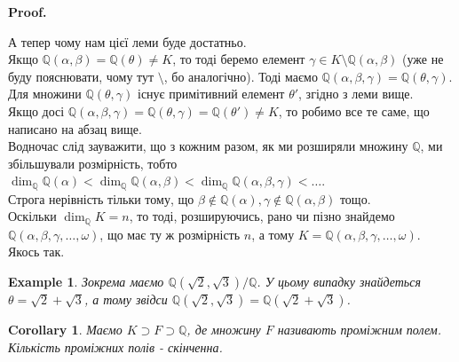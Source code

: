 \documentclass[a4paper, 10pt]{article}
\makeatletter
\theoremstyle{theoremdd}
\theoremstyle{theoremdd}
\theoremstyle{theoremdd}
\theoremstyle{theoremdd}
\newtheorem{example}[theorem]{Example}
\theoremstyle{theoremdd}
\theoremstyle{theoremdd}
\theoremstyle{theoremdd}
\theoremstyle{theoremdd}
\newtheorem{corollary}[theorem]{Corollary}
\renewenvironment{proof}[1][Proof.\\]{\par
\pushQED{\hfill \qed}%
\normalfont \topsep6\p@\@plus6\p@\relax
\trivlist
\item\relax
{\bfseries
#1\@addpunct{.}}\hspace\labelsep\ignorespaces
}{%
\popQED\endtrivlist\@endpefalse
}
\makeatother
\begin{document}
\begin{proof}
А тепер чому нам цієї леми буде достатньо.\\
Якщо $\mathbb{Q}(\alpha,\beta) = \mathbb{Q}(\theta) \neq K$, то тоді беремо елемент $\gamma \in K \setminus \mathbb{Q}(\alpha,\beta)$ (уже не буду пояснювати, чому тут $\setminus$, бо аналогічно). Тоді маємо $\mathbb{Q}(\alpha,\beta,\gamma) = \mathbb{Q}(\theta,\gamma)$. Для множини $\mathbb{Q}(\theta,\gamma)$ існує примітивний елемент $\theta'$, згідно з леми вище.\\
Якщо досі $\mathbb{Q}(\alpha,\beta,\gamma) = \mathbb{Q}(\theta, \gamma) = \mathbb{Q}(\theta') \neq K$, то робимо все те саме, що написано на абзац вище.
\bigskip \\
Водночас слід зауважити, що з кожним разом, як ми розширяли множину $\mathbb{Q}$, ми збільшували розмірність, тобто\\
$\dim_\mathbb{Q} \mathbb{Q}(\alpha) < \dim_\mathbb{Q} \mathbb{Q}(\alpha,\beta) < \dim_\mathbb{Q} \mathbb{Q}(\alpha,\beta,\gamma) < \dots$.\\
Строга нерівність тільки тому, що $\beta \not \in \mathbb{Q}(\alpha), \gamma \not \in \mathbb{Q}(\alpha,\beta)$ тощо.\\
Оскільки $\dim_\mathbb{Q} K = n$, то тоді, розшируючись, рано чи пізно знайдемо $\mathbb{Q}(\alpha,\beta,\gamma,\dots,\omega)$, що має ту ж розмірність $n$, а тому $K = \mathbb{Q}(\alpha,\beta,\gamma,\dots,\omega)$.\\
Якось так.
\end{proof}

\begin{example}
Зокрема маємо $\mathbb{Q}(\sqrt{2},\sqrt{3}) / \mathbb{Q}$. У цьому випадку знайдеться $\theta = \sqrt{2} + \sqrt{3}$, а тому звідси $\mathbb{Q}(\sqrt{2},\sqrt{3}) = \mathbb{Q}(\sqrt{2} + \sqrt{3})$.
\end{example}

\begin{corollary}
Маємо $K \supset F \supset \mathbb{Q}$, де множину $F$ називають проміжним полем. Кількість проміжних полів - скінченна.
\end{corollary}
\end{document}
